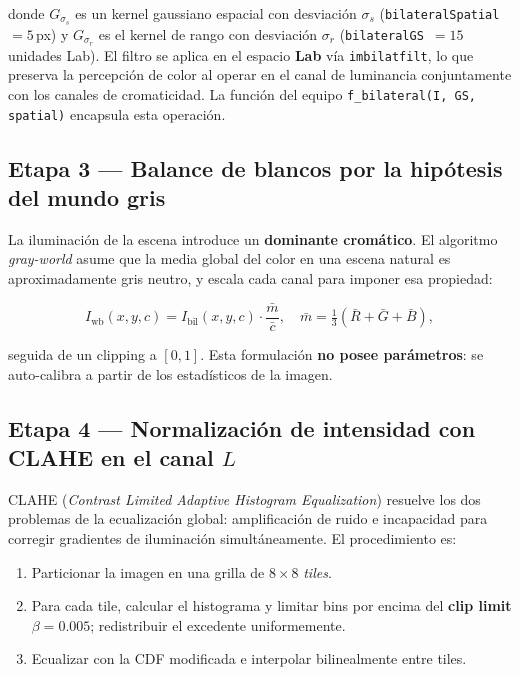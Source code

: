 \documentclass[11pt,a4paper]{article}
\begin{document}
donde \(G_{\sigma_s}\) es un kernel gaussiano espacial con desviación \(\sigma_s\)
(\texttt{bilateralSpatial}~$= 5$\,px) y \(G_{\sigma_r}\) es el kernel de rango con
desviación \(\sigma_r\) (\texttt{bilateralGS}~$= 15$\,unidades Lab). El filtro se
aplica en el espacio \textbf{Lab} vía \texttt{imbilatfilt}, lo que preserva
la percepción de color al operar en el canal de luminancia conjuntamente con los
canales de cromaticidad. La función del equipo \texttt{f\_bilateral(I, GS, spatial)}
encapsula esta operación.

\subsection{Etapa 3 — Balance de blancos por la hipótesis del mundo gris}
\label{sec:wb}

La iluminación de la escena introduce un \textbf{dominante cromático}. El algoritmo
\emph{gray-world} asume que la media global del color en una escena natural es
aproximadamente gris neutro, y escala cada canal para imponer esa propiedad:

\begin{equation}
    I_{\text{wb}}(x,y,c) = I_{\text{bil}}(x,y,c) \cdot \frac{\bar{m}}{\bar{c}},
    \quad \bar{m} = \tfrac{1}{3}(\bar{R}+\bar{G}+\bar{B}),
    \label{eq:grayworld}
\end{equation}

seguida de un clipping a \([0,1]\). Esta formulación \textbf{no posee parámetros}:
se auto-calibra a partir de los estadísticos de la imagen.

\subsection{Etapa 4 — Normalización de intensidad con CLAHE en el canal \(L\)}
\label{sec:clahe}

CLAHE (\emph{Contrast Limited Adaptive Histogram Equalization}) resuelve los dos
problemas de la ecualización global: amplificación de ruido e incapacidad para
corregir gradientes de iluminación simultáneamente. El procedimiento es:
\begin{enumerate}
    \item Particionar la imagen en una grilla de \(8\times 8\) \emph{tiles}.
    \item Para cada tile, calcular el histograma y limitar bins por encima del
          \textbf{clip limit} \(\beta = 0.005\); redistribuir el excedente uniformemente.
    \item Ecualizar con la CDF modificada e interpolar bilinealmente entre tiles.
\end{enumerate}
\end{document}
